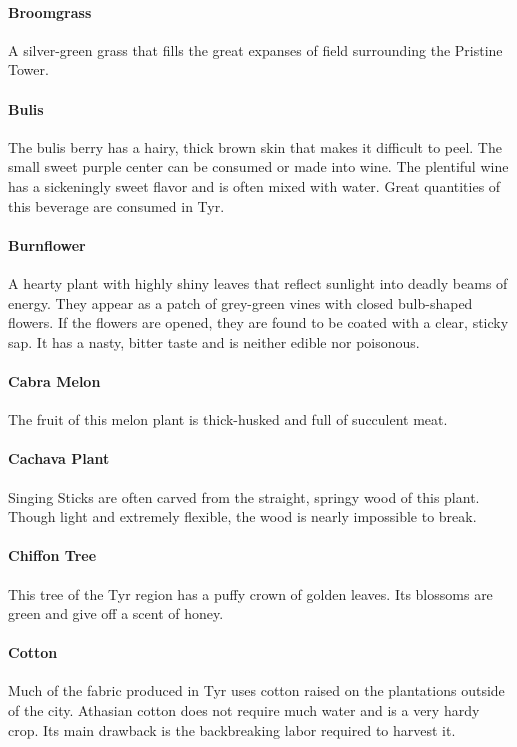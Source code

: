 \begin{multicols}{2}
\paragraph{Broomgrass}
A silver-green grass that fills the great expanses of field surrounding the
Pristine Tower.

\paragraph{Bulis}
The bulis berry has a hairy, thick brown skin that makes it difficult to
peel. The small sweet purple center can be consumed or made into wine. The
plentiful wine has a sickeningly sweet flavor and is often mixed with water.
Great quantities of this beverage are consumed in Tyr.

\paragraph{Burnflower}
A hearty plant with highly shiny leaves that reflect sunlight into deadly beams
of energy. They appear as a patch of grey-green vines with closed bulb-shaped
flowers. If the flowers are opened, they are found to be coated with a clear,
sticky sap. It has a nasty, bitter taste and is neither edible nor poisonous.

\paragraph{Cabra Melon}
The fruit of this melon plant is thick-husked and full of succulent meat.

\paragraph{Cachava Plant}
Singing Sticks are often carved from the straight, springy wood of this plant.
Though light and extremely flexible, the wood is nearly impossible to break.

\paragraph{Chiffon Tree}
This tree of the Tyr region has a puffy crown of golden leaves. Its blossoms
are green and give off a scent of honey.

\paragraph{Cotton}
Much of the fabric produced in Tyr uses cotton raised on the plantations outside
of the city. Athasian cotton does not require much water and is a very hardy
crop. Its main drawback is the backbreaking labor required to harvest it.


\end{multicols}
